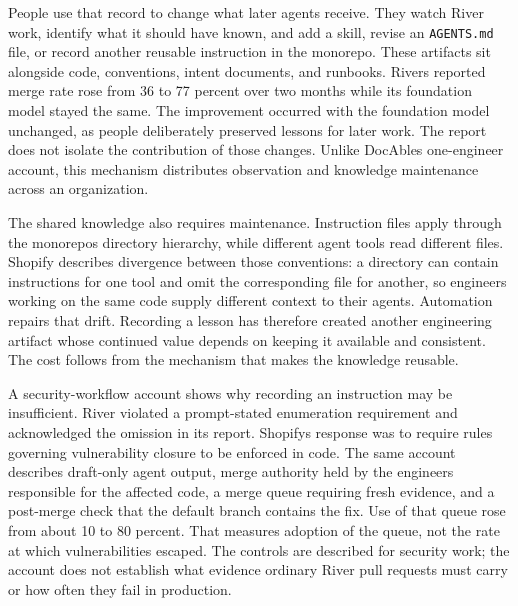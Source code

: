 People use that record to change what later agents receive. They watch River work, identify what it should have known, and add a skill, revise an \texttt{AGENTS.md} file, or record another reusable instruction in the monorepo\citep{moreno2026river}. These artifacts sit alongside code, conventions, intent documents, and runbooks. River\textquotesingle s reported merge rate rose from 36 to 77 percent over two months while its foundation model stayed the same\citep{lutke2026shopfloor}. The improvement occurred with the foundation model unchanged, as people deliberately preserved lessons for later work. The report does not isolate the contribution of those changes. Unlike DocAble\textquotesingle s one-engineer account, this mechanism distributes observation and knowledge maintenance across an organization.


The shared knowledge also requires maintenance. Instruction files apply through the monorepo\textquotesingle s directory hierarchy, while different agent tools read different files. Shopify describes divergence between those conventions: a directory can contain instructions for one tool and omit the corresponding file for another, so engineers working on the same code supply different context to their agents\citep{lutke2026splitbrain, caswell2026agentsmd}. Automation repairs that drift. Recording a lesson has therefore created another engineering artifact whose continued value depends on keeping it available and consistent. The cost follows from the mechanism that makes the knowledge reusable.


A security-workflow account shows why recording an instruction may be insufficient. River violated a prompt-stated enumeration requirement and acknowledged the omission in its report. Shopify\textquotesingle s response was to require rules governing vulnerability closure to be enforced in code. The same account describes draft-only agent output, merge authority held by the engineers responsible for the affected code, a merge queue requiring fresh evidence, and a post-merge check that the default branch contains the fix. Use of that queue rose from about 10 to 80 percent\citep{son2026security}. That measures adoption of the queue, not the rate at which vulnerabilities escaped. The controls are described for security work; the account does not establish what evidence ordinary River pull requests must carry or how often they fail in production.

